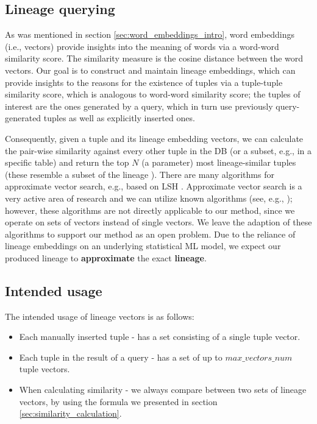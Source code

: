 \subsection{Lineage querying} As was mentioned in section \ref{sec:word_embeddings_intro}, word embeddings (i.e., vectors) provide insights into the meaning of words via a word-word similarity score. The similarity measure is the cosine distance between the word vectors. Our goal is to construct and maintain lineage embeddings, which can provide insights to the reasons for the existence of tuples via a tuple-tuple similarity score, which is analogous to word-word similarity score; the tuples of interest are the ones generated by a query, which in turn use previously query-generated tuples as well as explicitly inserted ones.
\par Consequently, given a tuple and its lineage embedding vectors, we can calculate the pair-wise similarity against every other tuple in the DB (or a subset, e.g., in a specific table) and return the top $N$ (a parameter) most lineage-similar tuples (these resemble a subset of the lineage \cite{Cui:2000:TLV:357775.357777}). 
There are many algorithms for approximate vector search, e.g., based on LSH \cite{lsh}. Approximate vector search is a very active area of research and we can utilize known algorithms (see, e.g., \cite{sugawara-etal-2016-approximately}); however, these algorithms are not directly applicable to our method, since we operate on sets of vectors instead of single vectors. We leave the adaption of these algorithms to support our method as an open problem.
Due to the reliance of lineage embeddings on an underlying statistical ML model, we expect our produced lineage to \textbf{approximate} the exact \textbf{lineage}.\\


\subsection{Intended usage} The intended usage of lineage vectors is as follows:
\begin{itemize}
    \item Each manually inserted tuple - has a set consisting of a single tuple vector.
    \item Each tuple in the result of a query - has a set of up to $max\_vectors\_num$ tuple vectors.
    \item When calculating similarity - we always compare between two sets of lineage vectors, by using the formula we presented in section \ref{sec:similarity_calculation}.
\end{itemize}
